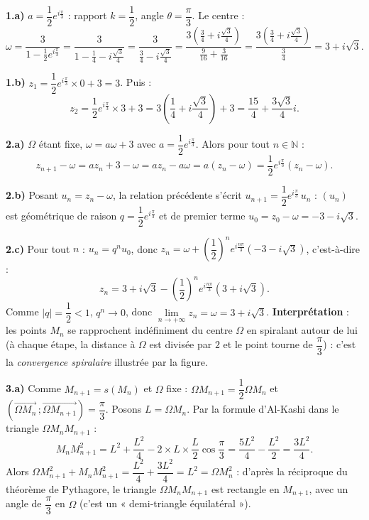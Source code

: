 \documentclass[11pt]{article}
\newcommand{\cle}[1]{{\popxbold\color{popdark}#1}}
\begin{document}
\begin{corrige}
\textbf{1.a)} $a = \dfrac{1}{2}e^{i\frac{\pi}{3}}$ : rapport $k = \dfrac{1}{2}$, angle $\theta = \dfrac{\pi}{3}$. Le centre :
\[ \omega = \frac{3}{1 - \frac{1}{2}e^{i\frac{\pi}{3}}} = \frac{3}{1 - \frac{1}{4} - i\frac{\sqrt{3}}{4}} = \frac{3}{\frac{3}{4} - i\frac{\sqrt{3}}{4}} = \frac{3\left(\frac{3}{4} + i\frac{\sqrt{3}}{4}\right)}{\frac{9}{16} + \frac{3}{16}} = \frac{3\left(\frac{3}{4} + i\frac{\sqrt{3}}{4}\right)}{\frac{3}{4}} = 3 + i\sqrt{3}. \]

\textbf{1.b)} $z_1 = \dfrac{1}{2}e^{i\frac{\pi}{3}} \times 0 + 3 = 3$. Puis :
\[ z_2 = \frac{1}{2}e^{i\frac{\pi}{3}} \times 3 + 3 = 3\left(\frac{1}{4} + i\frac{\sqrt{3}}{4}\right) + 3 = \frac{15}{4} + \frac{3\sqrt{3}}{4}i. \]

\textbf{2.a)} $\Omega$ étant fixe, $\omega = a\omega + 3$ avec $a = \dfrac{1}{2}e^{i\frac{\pi}{3}}$. Alors pour tout $n \in \mathbb{N}$ :
\[ z_{n+1} - \omega = a z_n + 3 - \omega = a z_n - a\omega = a\left(z_n - \omega\right) = \frac{1}{2}e^{i\frac{\pi}{3}}\left(z_n - \omega\right). \]

\textbf{2.b)} Posant $u_n = z_n - \omega$, la relation précédente s'écrit $u_{n+1} = \dfrac{1}{2}e^{i\frac{\pi}{3}}\,u_n$ : $(u_n)$ est \cle{géométrique} de raison $q = \dfrac{1}{2}e^{i\frac{\pi}{3}}$ et de premier terme $u_0 = z_0 - \omega = -3 - i\sqrt{3}$.

\textbf{2.c)} Pour tout $n$ : $u_n = q^n u_0$, donc $z_n = \omega + \left(\dfrac{1}{2}\right)^n e^{i\frac{n\pi}{3}}\left(-3 - i\sqrt{3}\right)$, c'est-à-dire :
\[ z_n = 3 + i\sqrt{3} - \left(\frac{1}{2}\right)^n e^{i\frac{n\pi}{3}}\left(3 + i\sqrt{3}\right). \]
Comme $|q| = \dfrac{1}{2} < 1$, $q^n \to 0$, donc $\lim\limits_{n\to+\infty} z_n = \omega = 3 + i\sqrt{3}$. \textbf{Interprétation} : les points $M_n$ se rapprochent indéfiniment du centre $\Omega$ en spiralant autour de lui (à chaque étape, la distance à $\Omega$ est divisée par $2$ et le point tourne de $\dfrac{\pi}{3}$) : c'est la \emph{convergence spiralaire} illustrée par la figure.

\textbf{3.a)} Comme $M_{n+1} = s(M_n)$ et $\Omega$ fixe : $\Omega M_{n+1} = \dfrac{1}{2}\Omega M_n$ et $\left(\overrightarrow{\Omega M_n}\,;\overrightarrow{\Omega M_{n+1}}\right) = \dfrac{\pi}{3}$. Posons $L = \Omega M_n$. Par la formule d'Al-Kashi dans le triangle $\Omega M_n M_{n+1}$ :
\[ M_nM_{n+1}^2 = L^2 + \frac{L^2}{4} - 2 \times L \times \frac{L}{2}\cos\frac{\pi}{3} = \frac{5L^2}{4} - \frac{L^2}{2} = \frac{3L^2}{4}. \]
Alors $\Omega M_{n+1}^2 + M_nM_{n+1}^2 = \dfrac{L^2}{4} + \dfrac{3L^2}{4} = L^2 = \Omega M_n^2$ : d'après la réciproque du théorème de Pythagore, le triangle $\Omega M_n M_{n+1}$ est \cle{rectangle en $M_{n+1}$}, avec un angle de $\dfrac{\pi}{3}$ en $\Omega$ (c'est un « demi-triangle équilatéral »).


\end{corrige}
\end{document}
